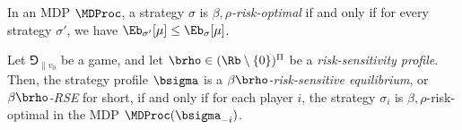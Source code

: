 In an MDP $\MDProc$, a strategy $\sigma$ is \emph{$\beta,\rho$-risk-optimal} if and only if for every strategy $\sigma'$, we have $\Eb_{\sigma'}[\mu] \leq \Eb_\sigma[\mu]$.


\begin{definition}
    Let $\Game_{\|v_0}$ be a game, and let $\brho \in (\Rb \setminus \{0\})^\Pi$ be a \emph{risk-sensitivity profile}.
    Then, the strategy profile $\bsigma$ is a \emph{$\beta\brho$-risk-sensitive equilibrium}, or \emph{$\beta\brho$-RSE} for short, if and only if for each player $i$, the strategy $\sigma_i$ is $\beta,\rho$-risk-optimal in the MDP $\MDProc(\bsigma_{-i})$.
\end{definition}